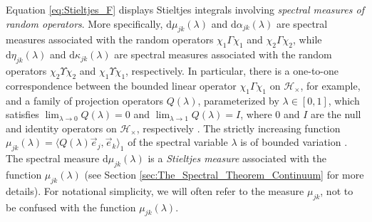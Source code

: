 \documentclass{cmslatex}
\renewcommand{\d}{\text{d}}
\begin{document}
Equation \eqref{eq:Stieltjes_F} displays Stieltjes integrals involving
\emph{spectral measures of random operators}. More specifically,
$\d\mu_{jk}(\lambda)$ and $\d\alpha_{jk}(\lambda)$ are spectral measures associated 
with the random operators $\chi_1\Gamma\chi_1$ and $\chi_2\Gamma\chi_2$, while
$\d\eta_{jk}(\lambda)$ and $\d\kappa_{jk}(\lambda)$ are spectral measures associated
with the random operators $\chi_2\Upsilon\chi_2$ and $\chi_1\Upsilon\chi_1$, respectively. In
particular, there is a one-to-one correspondence between the bounded 
linear operator $\chi_1\Gamma\chi_1$ on $\mathscr{H}_\times$, for example, and a
family of projection operators $Q(\lambda)$, parameterized by $\lambda\in[0,1]$, which
satisfies $\lim_{\lambda\to0}Q(\lambda)=0$ and $\lim_{\lambda\to1}Q(\lambda)=I$, where $0$ and $I$
are the null and identity operators on $\mathscr{H}_\times$, respectively
\cite{Stone:64}. The strictly increasing function
$\mu_{jk}(\lambda)=\langle Q(\lambda)\vec{e}_j,\vec{e}_k\rangle_1$ of the spectral variable $\lambda$ is
of bounded variation \cite{Stone:64}. The spectral measure
$\d\mu_{jk}(\lambda)$ is a \emph{Stieltjes measure} \cite{Folland:99}
associated with the function $\mu_{jk}(\lambda)$ \cite{Stone:64} (see Section
\ref{sec:The_Spectral_Theorem_Continuum} for more details). For
notational simplicity, we will often refer to the measure $\mu_{jk}$,
not to be confused with the function $\mu_{jk}(\lambda)$.  
\end{document}
